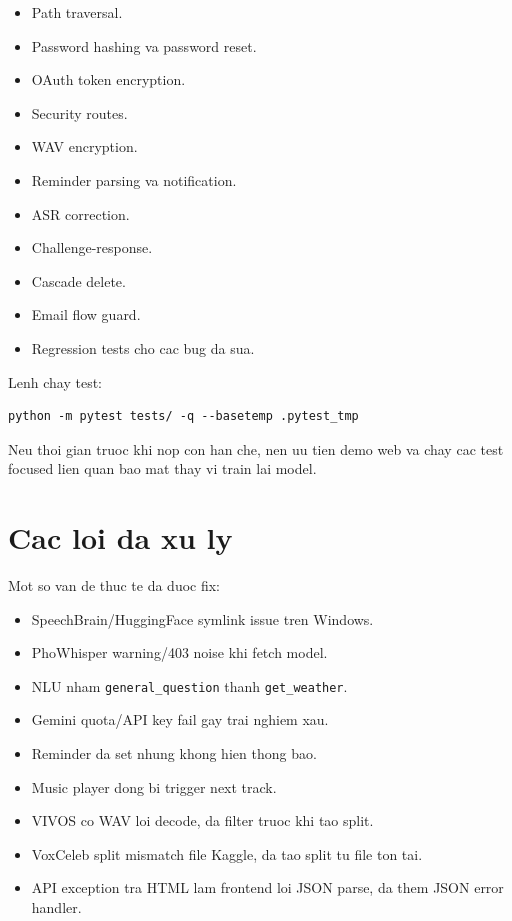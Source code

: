 \documentclass[12pt,a4paper]{article}
\begin{document}
\begin{itemize}
  \item Path traversal.
  \item Password hashing va password reset.
  \item OAuth token encryption.
  \item Security routes.
  \item WAV encryption.
  \item Reminder parsing va notification.
  \item ASR correction.
  \item Challenge-response.
  \item Cascade delete.
  \item Email flow guard.
  \item Regression tests cho cac bug da sua.
\end{itemize}

Lenh chay test:

\begin{lstlisting}
python -m pytest tests/ -q --basetemp .pytest_tmp
\end{lstlisting}

Neu thoi gian truoc khi nop con han che, nen uu tien demo web va chay cac test
focused lien quan bao mat thay vi train lai model.

\section{Cac loi da xu ly}

Mot so van de thuc te da duoc fix:

\begin{itemize}
  \item SpeechBrain/HuggingFace symlink issue tren Windows.
  \item PhoWhisper warning/403 noise khi fetch model.
  \item NLU nham \texttt{general\_question} thanh \texttt{get\_weather}.
  \item Gemini quota/API key fail gay trai nghiem xau.
  \item Reminder da set nhung khong hien thong bao.
  \item Music player dong bi trigger next track.
  \item VIVOS co WAV loi decode, da filter truoc khi tao split.
  \item VoxCeleb split mismatch file Kaggle, da tao split tu file ton tai.
  \item API exception tra HTML lam frontend loi JSON parse, da them JSON error handler.
\end{itemize}
\end{document}

